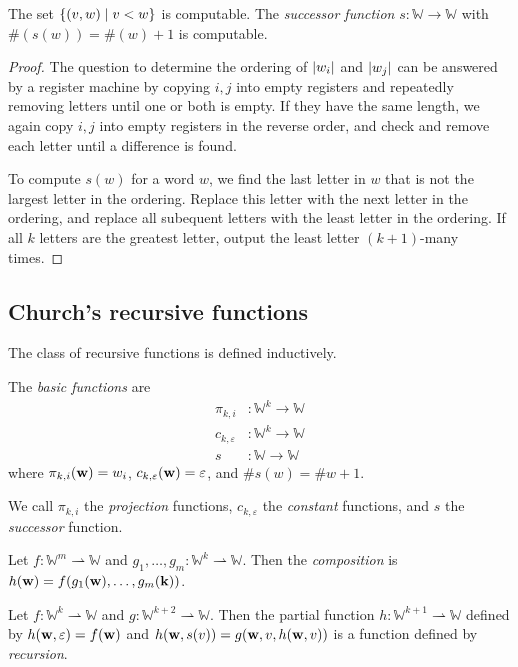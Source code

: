 \begin{theorem}
	The set \( \qty{(v,w) \mid v < w} \) is computable.
	The \emph{successor function} \( s \colon \mathbb W \to \mathbb W \) with \( \#(s(w)) = \#(w)+1 \) is computable.
\end{theorem}
\begin{proof}
	The question to determine the ordering of \( \abs{w_i} \) and \( \abs{w_j} \) can be answered by a register machine by copying \( i, j \) into empty registers and repeatedly removing letters until one or both is empty.
	If they have the same length, we again copy \( i, j \) into empty registers in the reverse order, and check and remove each letter until a difference is found.

	To compute \( s(w) \) for a word \( w \), we find the last letter in \( w \) that is not the largest letter in the ordering.
	Replace this letter with the next letter in the ordering, and replace all subequent letters with the least letter in the ordering.
	If all \( k \) letters are the greatest letter, output the least letter \( (k + 1) \)-many times.
\end{proof}

\subsection{Church's recursive functions}
The class of recursive functions is defined inductively.
\begin{definition}
	The \emph{basic functions} are
	\begin{align*}
		\pi_{k,i} &\colon \mathbb W^k \to \mathbb W \\
		c_{k,\varepsilon} &\colon \mathbb W^k \to \mathbb W \\
		s &\colon \mathbb W \to \mathbb W
	\end{align*}
	where \( \pi_{k,i}(\vb w) = w_i \), \( c_{k,\varepsilon}(\vb w) = \varepsilon \), and \( \# s(w) = \# w + 1 \).
\end{definition}
We call \( \pi_{k,i} \) the \emph{projection} functions, \( c_{k,\varepsilon} \) the \emph{constant} functions, and \( s \) the \emph{successor} function.

Let \( f \colon \mathbb W^m \rightharpoonup \mathbb W \) and \( g_1, \dots, g_m \colon \mathbb W^k \rightharpoonup \mathbb W \).
Then the \emph{composition} is \( h(\vb w) = f(g_1(\vb w), \dots, g_m(\vb k)) \).

Let \( f \colon \mathbb W^k \rightharpoonup \mathbb W \) and \( g \colon \mathbb W^{k+2} \rightharpoonup \mathbb W \).
Then the partial function \( h \colon \mathbb W^{k+1} \rightharpoonup \mathbb W \) defined by \( h(\vb w, \varepsilon) = f(\vb w) \) and \( h(\vb w, s(v)) = g(\vb w, v, h(\vb w, v)) \) is a function defined by \emph{recursion}.

